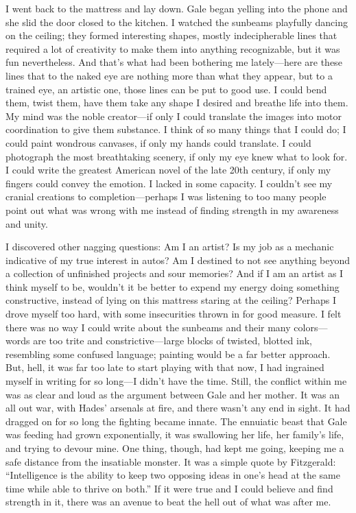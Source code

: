 I went back to the mattress and lay down. Gale began yelling into the
phone and she slid the door closed to the kitchen. I watched the
sunbeams playfully dancing on the ceiling; they formed interesting
shapes, mostly indecipherable lines that required a lot of creativity to
make them into anything recognizable, but it was fun nevertheless. And
that's what had been bothering me lately---here are these lines that to
the naked eye are nothing more than what they appear, but to a trained
eye, an artistic one, those lines can be put to good use. I could bend
them, twist them, have them take any shape I desired and breathe life
into them. My mind was the noble creator---if only I could translate the
images into motor coordination to give them substance. I think of so
many things that I could do; I could paint wondrous canvases, if only my
hands could translate. I could photograph the most breathtaking scenery,
if only my eye knew what to look for. I could write the greatest
American novel of the late 20th century, if only my fingers could convey
the emotion. I lacked in some capacity. I couldn't see my cranial
creations to completion---perhaps I was listening to too many people
point out what was wrong with me instead of finding strength in my
awareness and unity.

I discovered other nagging questions: Am I an artist? Is my job as a
mechanic indicative of my true interest in autos? Am I destined to not
see anything beyond a collection of unfinished projects and sour
memories? And if I am an artist as I think myself to be, wouldn't it be
better to expend my energy doing something constructive, instead of
lying on this mattress staring at the ceiling? Perhaps I drove myself
too hard, with some insecurities thrown in for good measure. I felt
there was no way I could write about the sunbeams and their many
colors---words are too trite and constrictive---large blocks of twisted,
blotted ink, resembling some confused language; painting would be a far
better approach. But, hell, it was far too late to start playing with
that now, I had ingrained myself in writing for so long---I didn't have
the time. Still, the conflict within me was as clear and loud as the
argument between Gale and her mother. It was an all out war, with Hades'
arsenals at fire, and there wasn't any end in sight. It had dragged on
for so long the fighting became innate. The ennuiatic beast that Gale
was feeding had grown exponentially, it was swallowing her life, her
family's life, and trying to devour mine. One thing, though, had kept me
going, keeping me a safe distance from the insatiable monster. It was a
simple quote by Fitzgerald: ``Intelligence is the ability to keep two
opposing ideas in one's head at the same time while able to thrive on
both.'' If it were true and I could believe and find strength in it,
there was an avenue to beat the hell out of what was after me.

